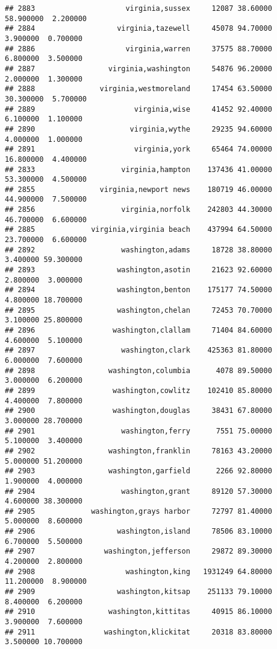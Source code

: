 \documentclass[
]{article}
\begin{document}
\begin{verbatim}
## 2883                     virginia,sussex     12087 38.60000 58.900000  2.200000
## 2884                   virginia,tazewell     45078 94.70000  3.900000  0.700000
## 2886                     virginia,warren     37575 88.70000  6.800000  3.500000
## 2887                 virginia,washington     54876 96.20000  2.000000  1.300000
## 2888               virginia,westmoreland     17454 63.50000 30.300000  5.700000
## 2889                       virginia,wise     41452 92.40000  6.100000  1.100000
## 2890                      virginia,wythe     29235 94.60000  4.000000  1.000000
## 2891                       virginia,york     65464 74.00000 16.800000  4.400000
## 2833                    virginia,hampton    137436 41.00000 53.300000  4.500000
## 2855               virginia,newport news    180719 46.00000 44.900000  7.500000
## 2856                    virginia,norfolk    242803 44.30000 46.700000  6.600000
## 2885             virginia,virginia beach    437994 64.50000 23.700000  6.600000
## 2892                    washington,adams     18728 38.80000  3.400000 59.300000
## 2893                   washington,asotin     21623 92.60000  2.800000  3.000000
## 2894                   washington,benton    175177 74.50000  4.800000 18.700000
## 2895                   washington,chelan     72453 70.70000  3.100000 25.800000
## 2896                  washington,clallam     71404 84.60000  4.600000  5.100000
## 2897                    washington,clark    425363 81.80000  6.000000  7.600000
## 2898                 washington,columbia      4078 89.50000  3.000000  6.200000
## 2899                  washington,cowlitz    102410 85.80000  4.400000  7.800000
## 2900                  washington,douglas     38431 67.80000  3.000000 28.700000
## 2901                    washington,ferry      7551 75.00000  5.100000  3.400000
## 2902                 washington,franklin     78163 43.20000  5.000000 51.200000
## 2903                 washington,garfield      2266 92.80000  1.900000  4.000000
## 2904                    washington,grant     89120 57.30000  4.600000 38.300000
## 2905             washington,grays harbor     72797 81.40000  5.000000  8.600000
## 2906                   washington,island     78506 83.10000  6.700000  5.500000
## 2907                washington,jefferson     29872 89.30000  4.200000  2.800000
## 2908                     washington,king   1931249 64.80000 11.200000  8.900000
## 2909                   washington,kitsap    251133 79.10000  8.400000  6.200000
## 2910                 washington,kittitas     40915 86.10000  3.900000  7.600000
## 2911                washington,klickitat     20318 83.80000  3.500000 10.700000

\end{verbatim}
\end{document}
